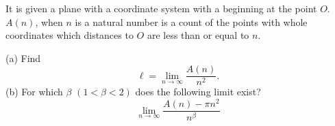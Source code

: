 It is given a plane with a coordinate system with a beginning at the point $O$. $A(n)$, when $n$ is a natural number is a count of the points with whole coordinates which distances to $O$ are less than or equal to $n$.

(a) Find
$$\ell=\lim_{n\to\infty}\frac{A(n)}{n^2}.$$(b) For which $\beta$ $(1<\beta<2)$ does the following limit exist?
$$\lim_{n\to\infty}\frac{A(n)-\pi n^2}{n^\beta}$$